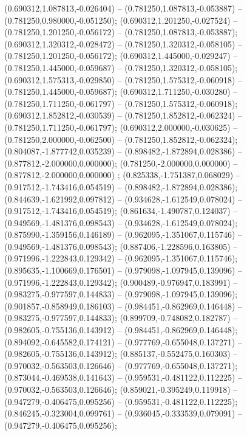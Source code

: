  (0.690312,1.087813,-0.026404) -- (0.781250,1.087813,-0.053887) -- (0.781250,0.980000,-0.051250);
 (0.690312,1.201250,-0.027524) -- (0.781250,1.201250,-0.056172) -- (0.781250,1.087813,-0.053887);
 (0.690312,1.320312,-0.028472) -- (0.781250,1.320312,-0.058105) -- (0.781250,1.201250,-0.056172);
 (0.690312,1.445000,-0.029247) -- (0.781250,1.445000,-0.059687) -- (0.781250,1.320312,-0.058105);
 (0.690312,1.575313,-0.029850) -- (0.781250,1.575312,-0.060918) -- (0.781250,1.445000,-0.059687);
 (0.690312,1.711250,-0.030280) -- (0.781250,1.711250,-0.061797) -- (0.781250,1.575312,-0.060918);
 (0.690312,1.852812,-0.030539) -- (0.781250,1.852812,-0.062324) -- (0.781250,1.711250,-0.061797);
 (0.690312,2.000000,-0.030625) -- (0.781250,2.000000,-0.062500) -- (0.781250,1.852812,-0.062324);
 (0.804087,-1.877742,0.035239) -- (0.898482,-1.872894,0.028386) -- (0.877812,-2.000000,0.000000);
 (0.781250,-2.000000,0.000000) -- (0.877812,-2.000000,0.000000) ;
 (0.825338,-1.751387,0.068029) -- (0.917512,-1.743416,0.054519) -- (0.898482,-1.872894,0.028386);
 (0.844639,-1.621992,0.097812) -- (0.934628,-1.612549,0.078024) -- (0.917512,-1.743416,0.054519);
 (0.861634,-1.490787,0.124037) -- (0.949569,-1.481376,0.098543) -- (0.934628,-1.612549,0.078024);
 (0.875990,-1.359156,0.146189) -- (0.962095,-1.351067,0.115746) -- (0.949569,-1.481376,0.098543);
 (0.887406,-1.228596,0.163805) -- (0.971996,-1.222843,0.129342) -- (0.962095,-1.351067,0.115746);
 (0.895635,-1.100669,0.176501) -- (0.979098,-1.097945,0.139096) -- (0.971996,-1.222843,0.129342);
 (0.900489,-0.976947,0.183991) -- (0.983275,-0.977597,0.144833) -- (0.979098,-1.097945,0.139096);
 (0.901857,-0.858949,0.186103) -- (0.984451,-0.862969,0.146448) -- (0.983275,-0.977597,0.144833);
 (0.899709,-0.748082,0.182787) -- (0.982605,-0.755136,0.143912) -- (0.984451,-0.862969,0.146448);
 (0.894092,-0.645582,0.174121) -- (0.977769,-0.655048,0.137271) -- (0.982605,-0.755136,0.143912);
 (0.885137,-0.552475,0.160303) -- (0.970032,-0.563503,0.126646) -- (0.977769,-0.655048,0.137271);
 (0.873044,-0.469538,0.141643) -- (0.959531,-0.481122,0.112225) -- (0.970032,-0.563503,0.126646);
 (0.859021,-0.395249,0.119918) -- (0.947279,-0.406475,0.095256) -- (0.959531,-0.481122,0.112225);
 (0.846245,-0.323004,0.099761) -- (0.936045,-0.333539,0.079091) -- (0.947279,-0.406475,0.095256);
